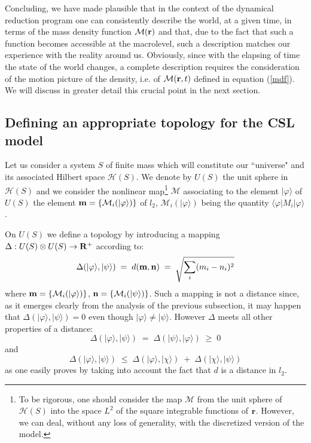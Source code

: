 \documentclass[10pt,a4paper]{article}
\begin{document}
Concluding, we have made plausible that in the context of the
dynamical reduction program one can consistently describe the
world, at a given time, in terms of the mass density function
${\mathcal M}({\bf r})$ and that, due to the fact that such a function
becomes accessible at the macrolevel, such a description matches our
experience with the reality around us. Obviously, since with the elapsing
of time the state of the world changes, a complete description requires
the consideration of the motion picture of the density, i.e. of
${\mathcal M}({\bf r}, t)$ defined in equation (\ref{mdf}). We will
discuss in greater detail this crucial point in the next section.

\subsection{Defining an appropriate topology for the CSL model}
\label{sec124}

Let us consider a system $S$ of finite mass which will constitute
our ``universe" and its associated Hilbert space ${\mathcal
H}(S)$. We denote by $U(S)$ the unit sphere in ${\mathcal H}(S)$
and we consider the nonlinear map\footnote{To be rigorous, one
should consider the map ${\mathcal M}$ from the unit sphere of
${\mathcal H}(S)$ into the space $L^{2}$ of the square integrable
functions of ${\bf r}$. However, we can deal, without any loss of
generality, with the discretized version of the model.} ${\mathcal
M}$ associating to the element $|\varphi\rangle$ of $U(S)$ the
element ${\bf m} = \{ {\mathcal M}_{i}(|\varphi\rangle) \}$ of
$l_{2}$, $ {\mathcal M}_{i}(|\varphi\rangle)$ being the quantity
$\langle\varphi|M_{i}|\varphi\rangle$.

On $U(S)$ we define a topology by introducing a mapping $\Delta :
U(S) \otimes U(S) \rightarrow {\bf R}^{+}$ according to:
\begin{equation}
\Delta (|\varphi\rangle, |\psi\rangle) \; = \; d({\bf m}, {\bf n})
\; = \; \sqrt{\sum_{i}(m_{i} - n_{i})^{2}}
\end{equation}
where ${\bf m} = \{ {\mathcal M}_{i}(|\varphi\rangle) \}$, ${\bf
n} = \{ {\mathcal M}_{i}(|\psi\rangle) \}$. Such a mapping is not
a distance since, as it emerges clearly from the analysis of the
previous subsection, it may happen that $\Delta (|\varphi\rangle,
|\psi\rangle) = 0$ even though $|\varphi\rangle \neq
|\psi\rangle$. However $\Delta$ meets all other properties of a
distance:
\begin{equation}
\Delta (|\varphi\rangle, |\psi\rangle) \; = \; \Delta
(|\psi\rangle, |\varphi\rangle) \; \geq \; 0
\end{equation}
and
\begin{equation}
\Delta (|\varphi\rangle, |\psi\rangle) \; \leq \; \Delta
(|\varphi\rangle, |\chi\rangle) \; + \; \Delta (|\chi\rangle,
|\psi\rangle)
\end{equation}
as one  easily proves by taking into account the fact that $d$ is
a distance in $l_{2}$.
\end{document}
